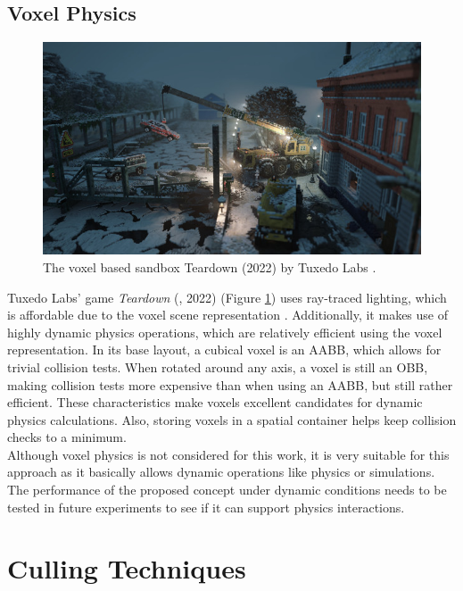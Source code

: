 \subsection*{Voxel Physics} \label{subsec-voxel-physics}

\begin{figure}[h]
    \centering
    \includegraphics[width=\linewidth]{images/graphics/teardown.jpg}
    \caption{The voxel based sandbox Teardown (2022) by Tuxedo Labs \cite{TuxedoLabs2022}.}
    \label{fig:teardown}
\end{figure}

\noindent
Tuxedo Labs' game \emph{Teardown} (\cite{TeardownSteam2022}, 2022) (Figure \ref{fig:teardown}) uses ray-traced 
lighting, which is affordable due to the voxel scene representation \cite{TuxedoLabs2022}. Additionally, 
it makes use of highly dynamic physics operations, which are relatively efficient using the voxel representation. 
In its base layout, a cubical voxel is an \ac{AABB}, which allows for trivial collision tests. When rotated 
around any axis, a voxel is still an \ac{OBB}, making collision tests more expensive than when using an \ac{AABB}, 
but still rather efficient. These characteristics make voxels excellent candidates for dynamic physics 
calculations. Also, storing voxels in a spatial container helps keep collision checks to a minimum. \\

\noindent
Although voxel physics is not considered for this work, it is very suitable for this approach as it basically 
allows dynamic operations like physics or simulations. The performance of the proposed concept under dynamic 
conditions needs to be tested in future experiments to see if it can support physics interactions. 


\section{Culling Techniques} \label{sec-culling-techniques}

